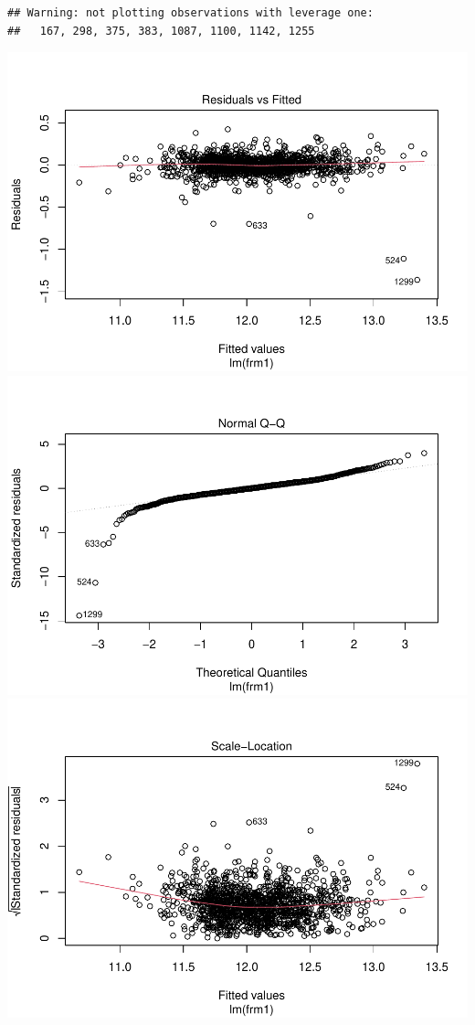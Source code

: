 \documentclass[
]{article}
\begin{document}
\begin{verbatim}
## Warning: not plotting observations with leverage one:
##   167, 298, 375, 383, 1087, 1100, 1142, 1255
\end{verbatim}

\includegraphics{Project_files/figure-latex/unnamed-chunk-42-1.pdf} \includegraphics{Project_files/figure-latex/unnamed-chunk-42-2.pdf} \includegraphics{Project_files/figure-latex/unnamed-chunk-42-3.pdf}
\end{document}
